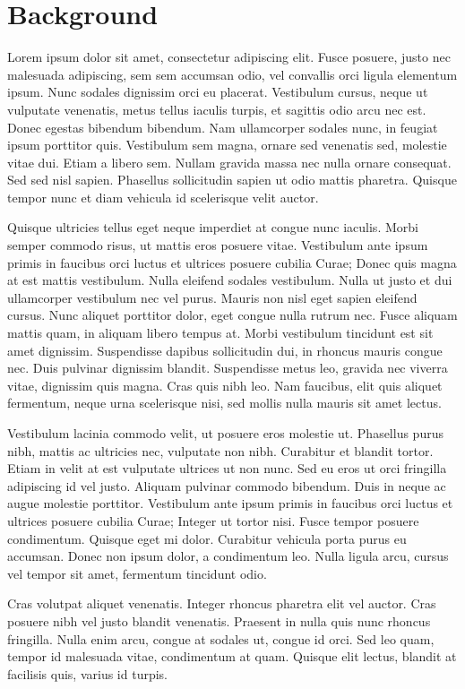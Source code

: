 \chapter{Background}

Lorem ipsum dolor sit amet, consectetur adipiscing elit. Fusce posuere, justo nec malesuada adipiscing, sem sem accumsan odio, vel convallis orci ligula elementum ipsum. Nunc sodales dignissim orci eu placerat. Vestibulum cursus, neque ut vulputate venenatis, metus tellus iaculis turpis, et sagittis odio arcu nec est. Donec egestas bibendum bibendum. Nam ullamcorper sodales nunc, in feugiat ipsum porttitor quis. Vestibulum sem magna, ornare sed venenatis sed, molestie vitae dui. Etiam a libero sem. Nullam gravida massa nec nulla ornare consequat. Sed sed nisl sapien. Phasellus sollicitudin sapien ut odio mattis pharetra. Quisque tempor nunc et diam vehicula id scelerisque velit auctor.

Quisque ultricies tellus eget neque imperdiet at congue nunc iaculis. Morbi semper commodo risus, ut mattis eros posuere vitae. Vestibulum ante ipsum primis in faucibus orci luctus et ultrices posuere cubilia Curae; Donec quis magna at est mattis vestibulum. Nulla eleifend sodales vestibulum. Nulla ut justo et dui ullamcorper vestibulum nec vel purus. Mauris non nisl eget sapien eleifend cursus. Nunc aliquet porttitor dolor, eget congue nulla rutrum nec. Fusce aliquam mattis quam, in aliquam libero tempus at. Morbi vestibulum tincidunt est sit amet dignissim. Suspendisse dapibus sollicitudin dui, in rhoncus mauris congue nec. Duis pulvinar dignissim blandit. Suspendisse metus leo, gravida nec viverra vitae, dignissim quis magna. Cras quis nibh leo. Nam faucibus, elit quis aliquet fermentum, neque urna scelerisque nisi, sed mollis nulla mauris sit amet lectus.

Vestibulum lacinia commodo velit, ut posuere eros molestie ut. Phasellus purus nibh, mattis ac ultricies nec, vulputate non nibh. Curabitur et blandit tortor. Etiam in velit at est vulputate ultrices ut non nunc. Sed eu eros ut orci fringilla adipiscing id vel justo. Aliquam pulvinar commodo bibendum. Duis in neque ac augue molestie porttitor. Vestibulum ante ipsum primis in faucibus orci luctus et ultrices posuere cubilia Curae; Integer ut tortor nisi. Fusce tempor posuere condimentum. Quisque eget mi dolor. Curabitur vehicula porta purus eu accumsan. Donec non ipsum dolor, a condimentum leo. Nulla ligula arcu, cursus vel tempor sit amet, fermentum tincidunt odio.

Cras volutpat aliquet venenatis. Integer rhoncus pharetra elit vel auctor. Cras posuere nibh vel justo blandit venenatis. Praesent in nulla quis nunc rhoncus fringilla. Nulla enim arcu, congue at sodales ut, congue id orci. Sed leo quam, tempor id malesuada vitae, condimentum at quam. Quisque elit lectus, blandit at facilisis quis, varius id turpis.

